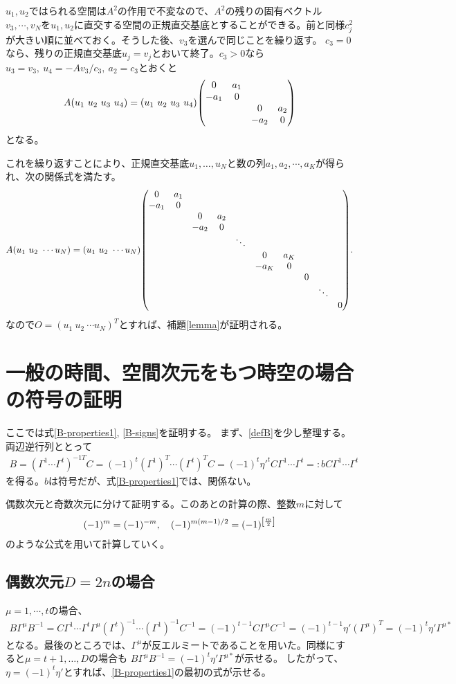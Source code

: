 \documentclass[12pt,a4paper,dvipdfmx]{jlreq}
\begin{document}
$u_1,u_2$ではられる空間は$A^2$の作用で不変なので、$A^2$の残りの固有ベクトル$v_3,\cdots,v_N$を$u_1,u_2$に直交する空間の正規直交基底とすることができる。前と同様$c_j^2$が大きい順に並べておく。そうした後、$v_3$を選んで同じことを繰り返す。
$c_3=0$なら、残りの正規直交基底$u_j=v_j$とおいて終了。$c_3 > 0$なら$u_3=v_3,\ u_4=-Av_3/c_3,\  a_2=c_3$とおくと
\begin{align*}
  A(u_1 \ u_2 \ u_3 \ u_4)=(u_1 \ u_2 \ u_3 \ u_4)\mqty(\dmat{0&a_1\\-a_1&0, 0&a_2\\-a_2&0})
\end{align*}
となる。

これを繰り返すことにより、正規直交基底$u_1,\dots,u_N$と数の列$a_1,a_2,\cdots,a_K$が得られ、次の関係式を満たす。
\begin{align*}
  A(u_1\ u_2\ \cdots u_N)=(u_1\ u_2\ \cdots u_N)
  \mqty(\dmat{0&a_1\\-a_1&0, 0&a_2\\-a_2&0,\ddots,0&a_K\\-a_K&0, 0, \ddots,0}).
\end{align*}
なので$O=(u_1\ u_2\ \cdots u_N)^T$とすれば、補題\ref{lemma}が証明される。


\section{一般の時間、空間次元をもつ時空の場合の符号の証明}
\label{app:proofB}
ここでは式\eqref{B-properties1}, \eqref{B-signs}を証明する。
まず、\eqref{defB}を少し整理する。両辺逆行列ととって
\begin{align*}
  B=(\Gamma^{1} \cdots \Gamma^{t})^{-1 T} C
  =(-1)^t (\Gamma^{1})^T \cdots (\Gamma^{t})^{T} C
  =(-1)^t \eta'^t C \Gamma^{1} \cdots \Gamma^{t}
  =: b C \Gamma^{1} \cdots \Gamma^{t}
\end{align*}
を得る。$b$は符号だが、式\eqref{B-properties1}では、関係ない。

偶数次元と奇数次元に分けて証明する。このあとの計算の際、整数$m$に対して
\begin{align*}
  (-1)^m=(-1)^{-m},\quad
  (-1)^{m(m-1)/2}=(-1)^{\qty[\frac{m}{2}]}
\end{align*}
のような公式を用いて計算していく。

\subsection{偶数次元$D=2n$の場合}
$\mu=1,\cdots,t$の場合、
\begin{align*}
  B\Gamma^{\mu}B^{-1}
  =C \Gamma^{1} \cdots \Gamma^{t} \Gamma^{\mu} (\Gamma^{t})^{-1} \cdots (\Gamma^{1})^{-1} C^{-1}
  =(-1)^{t-1} C\Gamma^{\mu}C^{-1}
  =(-1)^{t-1} \eta' (\Gamma^{\mu})^T
  =(-1)^{t} \eta' \Gamma^{\mu*}
\end{align*}
となる。最後のところでは、$\Gamma^{\mu}$が反エルミートであることを用いた。同様にすると$\mu=t+1,\dots,D$の場合も
$B\Gamma^{\mu}B^{-1}=(-1)^{t}\eta'\Gamma^{\mu *}$が示せる。
したがって、$\eta=(-1)^t \eta'$とすれば、\eqref{B-properties1}の最初の式が示せる。
\end{document}

